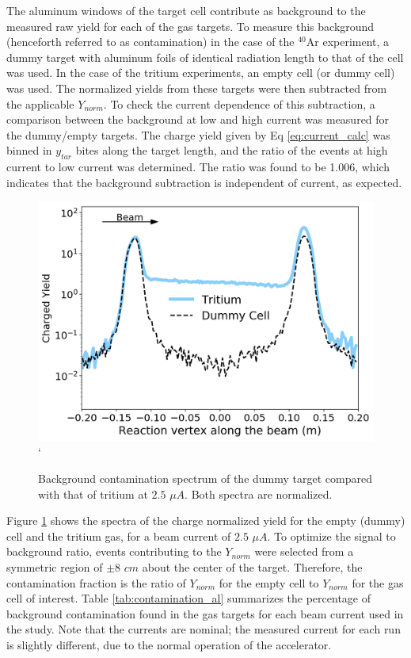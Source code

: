 \documentclass[final,5p,times,twocolumn]{elsarticle}
\begin{document}
The aluminum windows of the target cell contribute as background to the measured raw yield for each of the gas targets. To measure this background (henceforth referred to as contamination) in the case of the $^{40}$Ar experiment, a dummy target with aluminum foils of identical radiation length to that of the cell was used. In the case of the tritium experiments, an empty cell (or dummy cell)  was used. The normalized yields from these targets were then subtracted from the applicable $Y_{norm}$. To check the current dependence of this subtraction, a comparison between the background at low and high current was measured for the dummy/empty targets. The charge yield given by Eq \ref{eq:current_calc} was binned in $y_{tar}$ bites along the target length, and the ratio of the events at high current to low current was determined. The ratio was found to be 1.006, which indicates that the background subtraction is independent of current, as expected. 

\begin{figure}[h]
 \centering
 \includegraphics[width=\linewidth]{contamination.pdf}`
  \caption{Background contamination spectrum of the dummy target compared with that of tritium at $2.5$ $\mu A$. Both spectra are normalized.}
  \label{fig:bk_empty}
\end{figure}

Figure \ref{fig:bk_empty} shows the spectra of the charge normalized yield for the empty (dummy) cell and the tritium gas, for a beam current of $2.5$ $\mu A$. To optimize the signal to background ratio, events contributing to the $Y_{norm}$ were selected from a symmetric region of $\pm 8$ $cm$ about the center of the target. Therefore, the contamination fraction is the ratio of $Y_{norm}$ for the empty cell to $Y_{norm}$ for the gas cell of interest. Table \ref{tab:contamination_al} summarizes the percentage of background contamination found in the gas targets for each beam current used in the study. Note that the currents are nominal; the measured current for each run is slightly different, due to the normal operation of the accelerator.
 
\end{document}
